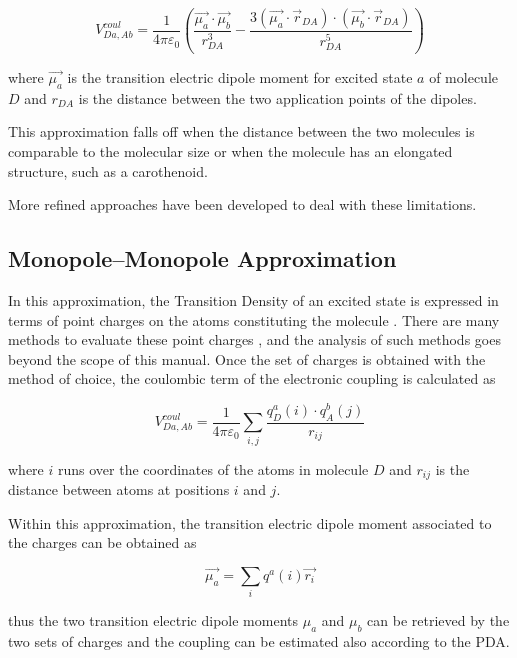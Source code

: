 \documentclass[a4paper]{article}
\begin{document}
\begin{equation}
 V^{coul}_{Da,Ab} = \frac{1}{4\pi\varepsilon_0} \left( \frac{\vec{\mu_a}\cdot\vec{\mu_b}}{r_{DA}^3} - \frac{3(\vec{\mu_a}\cdot \vec{r}_{DA})\cdot(\vec{\mu_b}\cdot\vec{r}_{DA})}{r_{DA}^5} \right)
 \label{eq:PDA}
\end{equation}

where $\vec{\mu_a}$ is the transition electric dipole moment for excited state $a$ of molecule $D$ and $r_{DA}$ is the distance between the two application points of the dipoles.

This approximation falls off when the distance between the two molecules is comparable to the molecular size or when the molecule has an elongated structure, such as a carothenoid.

More refined approaches have been developed to deal with these limitations.

\subsection*{Monopole--Monopole Approximation}
In this approximation, the Transition Density of an excited state is expressed in terms of point charges on the atoms constituting the molecule \cite{Woody1968}. There are many methods to evaluate these point charges \cite{Madjet2006}, and the analysis of such methods goes beyond the scope of this manual. Once the set of charges is obtained with the method of choice, the coulombic term of the electronic coupling is calculated as

\begin{equation}
 V^{coul}_{Da,Ab} = \frac{1}{4\pi\varepsilon_0} \sum_{i,j} \frac{q_D^a(i)\cdot q_A^b(j)}{r_{ij}}
 \label{eq:MMA}
\end{equation}

where $i$ runs over the coordinates of the atoms in molecule $D$ and $r_{ij}$ is the distance between atoms at positions $i$ and $j$.

Within this approximation, the transition electric dipole moment associated to the charges can be obtained as

\begin{equation}
 \vec{\mu_a} = \sum_i q^a(i) \vec{r_i}
 \label{eq:mu_MMA}
\end{equation}

thus the two transition electric dipole moments $\mu_a$ and $\mu_b$ can be retrieved by the two sets of charges and the coupling can be estimated also according to the PDA.
\end{document}
